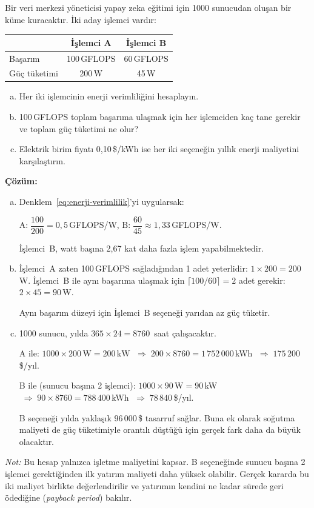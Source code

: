 \begin{ornek}[2.13]
Bir veri merkezi yöneticisi yapay zeka eğitimi için 1000 sunucudan oluşan bir küme kuracaktır. İki aday işlemci vardır:

\begin{center}
\begin{tabular}{lcc}
\toprule
& \textbf{İşlemci A} & \textbf{İşlemci B} \\
\midrule
Başarım & 100\,GFLOPS & 60\,GFLOPS \\
Güç tüketimi & 200\,W & 45\,W \\
\bottomrule
\end{tabular}
\end{center}

\begin{enumerate}[(a)]
    \item Her iki işlemcinin enerji verimliliğini hesaplayın.
    \item 100\,GFLOPS toplam başarıma ulaşmak için her işlemciden kaç tane gerekir ve toplam güç tüketimi ne olur?
    \item Elektrik birim fiyatı 0,10\,\$/kWh ise her iki seçeneğin yıllık enerji maliyetini karşılaştırın.
\end{enumerate}

\textbf{Çözüm:}
\begin{enumerate}[(a)]
    \item Denklem~\ref{eq:enerji-verimlilik}'yi uygularsak:

    $\text{A:}\;\dfrac{100}{200} = 0{,}5$\,GFLOPS/W, \qquad $\text{B:}\;\dfrac{60}{45} \approx 1{,}33$\,GFLOPS/W.

    İşlemci~B, watt başına 2,67 kat daha fazla işlem yapabilmektedir.

    \item İşlemci~A zaten 100\,GFLOPS sağladığından 1 adet yeterlidir: $1 \times 200 = 200$\,W. İşlemci~B ile aynı başarıma ulaşmak için $\lceil 100/60 \rceil = 2$ adet gerekir: $2 \times 45 = 90$\,W.

    Aynı başarım düzeyi için İşlemci~B seçeneği yarıdan az güç tüketir.

    \item 1000 sunucu, yılda $365 \times 24 = 8760$~saat çalışacaktır.

    A ile: $1000 \times 200\,\text{W} = 200\,\text{kW}$ $\;\Rightarrow\; 200 \times 8760 = 1\,752\,000$\,kWh $\;\Rightarrow\; 175\,200$\,\$/yıl.

    B ile (sunucu başına 2 işlemci): $1000 \times 90\,\text{W} = 90$\,kW $\;\Rightarrow\; 90 \times 8760 = 788\,400$\,kWh $\;\Rightarrow\; 78\,840$\,\$/yıl.

    B seçeneği yılda yaklaşık 96\,000\,\$ tasarruf sağlar. Buna ek olarak soğutma maliyeti de güç tüketimiyle orantılı düştüğü için gerçek fark daha da büyük olacaktır.
\end{enumerate}

\noindent\emph{Not:} Bu hesap yalnızca işletme maliyetini kapsar. B seçeneğinde sunucu başına 2 işlemci gerektiğinden ilk yatırım maliyeti daha yüksek olabilir. Gerçek kararda bu iki maliyet birlikte değerlendirilir ve yatırımın kendini ne kadar sürede geri ödediğine (\emph{payback period}) bakılır.
\end{ornek}

